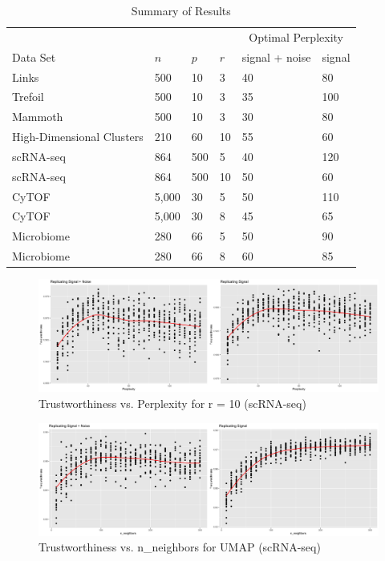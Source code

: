 \documentclass{article}
\begin{document}
\begin{table}[!b]
\centering
\begin{tabular}{@{}llllll@{}}
\toprule 
 & & & & \multicolumn{2}{c}{Optimal Perplexity} \\
\cmidrule{5-6}
Data Set & $n$ & $p$ & $r$ & signal + noise & signal \\
\midrule 
Links \cite{Distill} & 500 & 10 & 3 & 40 & 80 \\
Trefoil \cite{Distill} & 500 & 10 & 3 & 35 & 100 \\
Mammoth \cite{understanding DR} & 500 & 10 & 3 & 30 & 80 \\
High-Dimensional Clusters & 210 & 60 & 10 & 55 & 60 \\
scRNA-seq \cite{scRNA data} & 864 & 500 & 5 & 40 & 120 \\
scRNA-seq \cite{scRNA data} & 864 & 500 & 10 & 50 & 60 \\
CyTOF \cite{CyTOF data} & 5,000 & 30 & 5 & 50 & 110 \\
CyTOF \cite{CyTOF data} & 5,000 & 30 & 8 & 45 & 65 \\
Microbiome \cite{enterotype data} & 280 & 66 & 5 & 50 & 90 \\
Microbiome \cite{enterotype data} & 280 & 66 & 8 & 60 & 85 \\
\bottomrule
\end{tabular}
\caption{Summary of Results}
\end{table}

\renewcommand{\thefigure}{12}
\begin{figure}[t]
\centering
\includegraphics[scale=0.22]{trust_plot_scRNA2}
\caption{Trustworthiness vs. Perplexity for r = 10 (scRNA-seq)}
\end{figure}

\renewcommand{\thefigure}{13}
\begin{figure}[b]
\centering
\includegraphics[scale=0.11]{trust_plot_umap}
\caption{Trustworthiness vs. n\_neighbors for UMAP (scRNA-seq)}
\end{figure}
\end{document}
